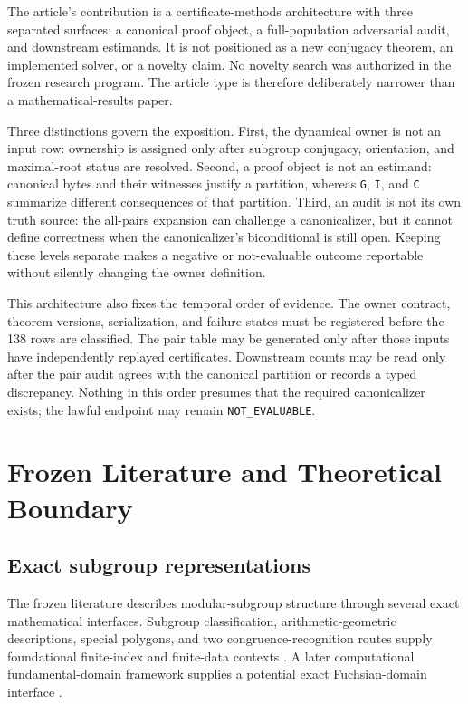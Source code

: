 \documentclass[11pt]{article}
\begin{document}
The article's contribution is a certificate-methods architecture with
three separated surfaces: a canonical proof object, a full-population
adversarial audit, and downstream estimands. It is not positioned as a
new conjugacy theorem, an implemented solver, or a novelty claim. No
novelty search was authorized in the frozen research program. The article type is therefore
deliberately narrower than a mathematical-results paper.

Three distinctions govern the exposition. First, the dynamical owner is
not an input row: ownership is assigned only after subgroup conjugacy,
orientation, and maximal-root status are resolved. Second, a proof
object is not an estimand: canonical bytes and their witnesses justify a
partition, whereas \texttt{G}, \texttt{I}, and \texttt{C} summarize
different consequences of that partition. Third, an audit is not its
own truth source: the all-pairs expansion can challenge a canonicalizer,
but it cannot define correctness when the canonicalizer's biconditional
is still open. Keeping these levels separate makes a negative or
not-evaluable outcome reportable without silently changing the owner
definition.

This architecture also fixes the temporal order of evidence. The owner
contract, theorem versions, serialization, and failure states must be
registered before the 138 rows are classified. The pair table may be
generated only after those inputs have independently replayed
certificates. Downstream counts may be read only after the pair audit
agrees with the canonical partition or records a typed discrepancy.
Nothing in this order presumes that the required canonicalizer exists;
the lawful endpoint may remain \texttt{NOT\_EVALUABLE}.

\hypertarget{2-frozen-literature-and-theoretical-boundary}{%
\section{Frozen Literature and Theoretical
Boundary}\label{2-frozen-literature-and-theoretical-boundary}}

\hypertarget{21-exact-subgroup-representations}{%
\subsection{Exact subgroup
representations}\label{21-exact-subgroup-representations}}

The frozen literature describes modular-subgroup structure through
several exact mathematical interfaces.
Subgroup classification, arithmetic-geometric descriptions, special
polygons, and two congruence-recognition routes supply foundational
finite-index and finite-data contexts
\citep{P31-S01,P31-S02,P31-S03,P31-S04,P31-S05}.
A later computational fundamental-domain framework supplies a potential
exact Fuchsian-domain interface
\citep{P31-S06}.
\end{document}
